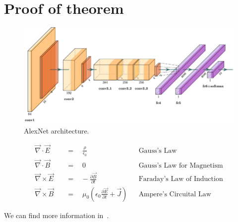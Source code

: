 \chapter{Proof of theorem}\label{app:Proof of theorem}
\lipsum[1]
\begin{figure}[thbp]
    \centering
    \includegraphics[width=\textwidth]{img/appendixA/alexnet.png}
    \caption{AlexNet architecture.}\label{fig:alexnet}
\end{figure}
\lipsum[1]
\begin{align}
     \vec{\nabla} \cdot \vec{E} \quad &=\quad\frac{\rho}{\epsilon_0} &&\text{Gauss's Law} \\      
    \vec{\nabla} \cdot \vec{B} \quad &=\quad 0 &&\text{Gauss's Law for Magnetism}\\
    \vec{\nabla} \times \vec{E} \quad &=\hspace{10pt}-\frac{\partial{\vec{B}}}{\partial{t}} &&\text{Faraday's Law of Induction} \\ 
    \vec{\nabla} \times \vec{B} \quad &=\quad \mu_0\left( \epsilon_0\frac{\partial{\vec{E}}}{\partial{t}}+\vec{J}\right) &&\text{Ampere's Circuital Law}
\end{align}

We can find more information in~\cite{li2018deep}.

